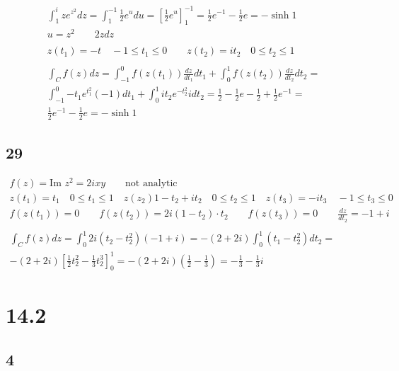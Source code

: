 \begin{gather*}
	\int_1^i{z e^{z^2} dz} = \int_1^{-1}{\frac{1}{2} e^u du} = \left[\frac{1}{2} e^{u}\right]_1^{-1} = \frac{1}{2} e^{-1} - \frac{1}{2} e = -\sinh{1}
	\\
	u = z^2 \qquad 2 z dz
	\\
	\\
	z(t_1) = -t \quad -1 \leq t_1 \leq 0
	\qquad
	z(t_2) = i t_2 \quad 0 \leq t_2 \leq 1
	\\
	\\
	\int_C{f(z) dz} = \int_{-1}^0{f(z(t_1)) \frac{dz}{dt_1} dt_1} + \int_{0}^1{f(z(t_2)) \frac{dz}{dt_2} dt_2}
	=
	\\
	\int_{-1}^0{-t_1 e^{t_1^2} (-1) dt_1} + \int_{0}^1{i t_2 e^{-t_2^2} i dt_2}
	=
	\frac{1}{2} - \frac{1}{2} e - \frac{1}{2} + \frac{1}{2} e^{-1}
	=
	\\
	\frac{1}{2} e^{-1} - \frac{1}{2} e = -\sinh{1}
\end{gather*}


\subsection*{29}


\begin{gather*}
	f(z) = \text{Im } z^2 = 2 i x y \qquad \text{not analytic}
	\\
	z(t_1) = t_1 \quad 0 \leq t_1 \leq 1
	\quad
	z(z_2) 1 - t_2 + i t_2 \quad 0 \leq t_2 \leq 1
	\quad
	z(t_3) = -i t_3 \quad -1 \leq t_3 \leq 0
	\\
	f(z(t_1)) = 0
	\qquad
	f(z(t_2)) = 2 i (1 - t_2) \cdot t_2
	\qquad
	f(z(t_3)) = 0
	\qquad
	\frac{d z}{d t_2} = -1 + i
	\\
	\\
	\int_C{f(z) dz} = \int_0^1{2 i (t_2 - t_2^2) (-1 + i)}
	=
	-(2 + 2 i) \int_0^1{(t_1 - t_2^2) dt_2}
	=
	\\
	-(2 + 2 i) \left[\frac{1}{2} t_2^2 - \frac{1}{3} t_2^3\right]_0^1
	=
	-(2 + 2 i) \left(\frac{1}{2} - \frac{1}{3}\right) = -\frac{1}{3} - \frac{1}{3} i
\end{gather*}


\section*{14.2}

\subsection*{4}


